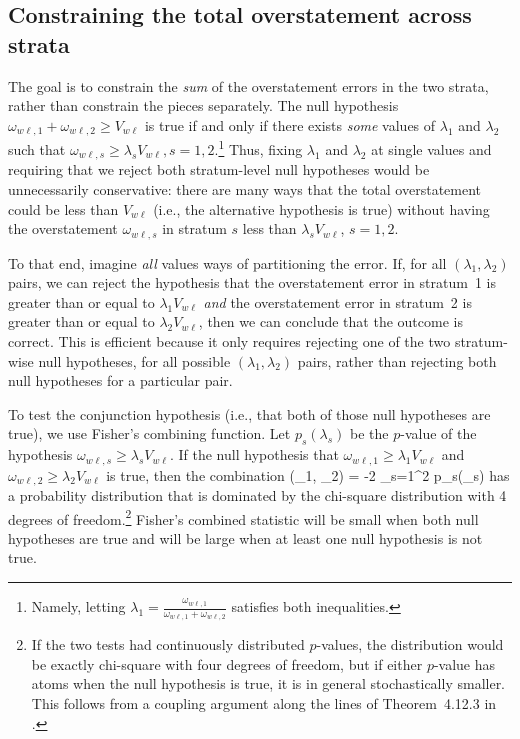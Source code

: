 \subsection{Constraining the total overstatement across strata}
The goal is to constrain the \emph{sum} of the overstatement errors in the two
strata, rather than constrain the pieces separately.
The null hypothesis $\omega_{w\ell, 1} + \omega_{w\ell, 2} \ge V_{w\ell}$ is true if and only if there exists \textit{some}
values of $\lambda_1$ and $\lambda_2$ such that $\omega_{w\ell, s}\ge \lambda_s V_{w\ell}, s=1, 2$.\footnote{
Namely, letting $\lambda_1 = \frac{\omega_{w\ell, 1}}{\omega_{w\ell, 1}+\omega_{w\ell, 2}}$ satisfies both inequalities.
}
Thus, fixing $\lambda_1$ and $\lambda_2$ at single values and requiring that we reject both stratum-level null hypotheses 
would be unnecessarily conservative:
there are many ways that the total overstatement could be less than $V_{w\ell}$ (i.e., the alternative hypothesis is true) without
having the overstatement $\omega_{w\ell,s}$ in stratum $s$ less than $\lambda_s V_{w\ell}$, $s = 1, 2$.

To that end, imagine \emph{all} values ways of partitioning the error.
If, for all $(\lambda_1, \lambda_2)$ pairs, we can reject the hypothesis that the 
overstatement error in stratum~1 is greater than or equal to $\lambda_1 V_{w\ell}$ \emph{and} 
the overstatement error in stratum~2 is greater than or equal to $\lambda_2 V_{w\ell}$, then
we can conclude that the outcome is correct.
This is efficient because it only requires rejecting one of the two stratum-wise null hypotheses,
for all possible $(\lambda_1, \lambda_2)$ pairs,
rather than rejecting both null hypotheses for a particular pair.

To test the conjunction hypothesis (i.e., that both of those null hypotheses are true), we use 
Fisher's combining function.
Let $p_s(\lambda_s)$ be the $p$-value of the hypothesis $\omega_{w\ell,s} \ge \lambda_s V_{w\ell}$.
If the null hypothesis that $\omega_{w\ell,1} \ge \lambda_1 V_{w\ell}$ and 
$\omega_{w\ell,2} \ge \lambda_2 V_{w\ell}$ is true, then the combination
\beq
   \chi(\lambda_1, \lambda_2) = -2 \sum_{s=1}^2 \ln p_s(\lambda_s)
\eeq
has a probability distribution that is dominated by the chi-square distribution with 4 degrees
of freedom.\footnote{%
   If the two tests had continuously distributed $p$-values, the distribution would be exactly
   chi-square with four degrees of freedom, but if either $p$-value has atoms when
   the null hypothesis is true, it is in general stochastically smaller.
   This follows from a coupling argument along the lines of Theorem~4.12.3 in \citet{grimmett01}.
}
Fisher's combined statistic will be small when both null hypotheses are true and will be large when
at least one null hypothesis is not true.

